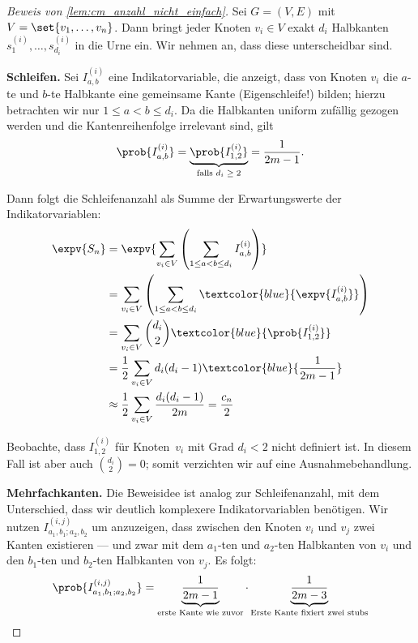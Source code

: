 \begin{proof}[Beweis von \cref{lem:cm_anzahl_nicht_einfach}]
    Sei $G= (V,E)$ mit $V = \set{v_1, \ldots, v_n}$.
    Dann bringt jeder Knoten $v_i \in V$ exakt $d_i$ Halbkanten $s_{1}^{(i)}, \ldots, s_{d_i}^{(i)}$ in die Urne ein.
    Wir nehmen an, dass diese unterscheidbar sind.

    \textbf{Schleifen. }
    Sei $I_{a,b}^{(i)}$ eine Indikatorvariable, die anzeigt, dass von Knoten $v_i$ die $a$-te und $b$-te Halbkante eine gemeinsame Kante (Eigenschleife!) bilden;
    hierzu betrachten wir nur $1\le a < b \le d_i$.
    Da die Halbkanten uniform zufällig gezogen werden und die Kantenreihenfolge irrelevant sind, gilt
    \begin{align}
        \prob{I_{a,b}^{(i)}} = \underbrace{\prob{I_{1,2}^{(i)}}}_\text{falls $d_i \ge 2$} = \frac{1}{2m - 1}.
    \end{align}

    \noindent
    Dann folgt die Schleifenanzahl als Summe der Erwartungswerte der Indikatorvariablen:
    \begin{align}
        \expv{S_n} & = \expv{\sum_{v_i \in V} \left( \sum_{1 \le a < b \le d_i} I_{a,b}^{(i)} \right)}                    \\
                   & = \sum_{v_i \in V}  \left( \sum_{1 \le a < b \le d_i} \textcolor{blue}{\expv{I_{a,b}^{(i)}}} \right) \\
                   & = \sum_{v_i \in V} \binom{d_i}{2} \textcolor{blue}{\prob{I_{1,2}^{(i)}}}                             \\
                   & = \frac 1 2 \sum_{v_i \in V} d_i (d_i - 1) \textcolor{blue}{\frac{1}{2m - 1}}                        \\
                   & \approx \frac 1 2 \sum_{v_i \in V} \frac{d_i (d_i - 1)}{2 m} = \frac{c_n}{2}
    \end{align}

    Beobachte, dass $I_{1,2}^{(i)}$ für Knoten~$v_i$ mit Grad $d_i <2$ nicht definiert ist.
    In diesem Fall ist aber auch $\binom{d_i}{2} = 0$; somit verzichten wir auf eine Ausnahmebehandlung.

    \textbf{Mehrfachkanten.}
    Die Beweisidee ist analog zur Schleifenanzahl, mit dem Unterschied, dass wir deutlich komplexere Indikatorvariablen benötigen.
    Wir nutzen $I^{(i,j)}_{a_1,b_1;a_2,b_2}$ um anzuzeigen, dass zwischen den Knoten $v_i$ und $v_j$ zwei Kanten existieren --- und zwar mit dem $a_1$-ten und $a_2$-ten Halbkanten von $v_i$ und den $b_1$-ten und $b_2$-ten Halbkanten von $v_j$.
    Es folgt:
    \begin{align}
        \prob{I^{(i,j)}_{a_1,b_1;a_2,b_2}} = \underbrace{\frac{1}{2m - 1}}_\text{erste Kante wie zuvor} \cdot \underbrace{\frac{1}{2m - 3}}_\text{Erste Kante fixiert zwei stubs}
    \end{align}


\end{proof}
